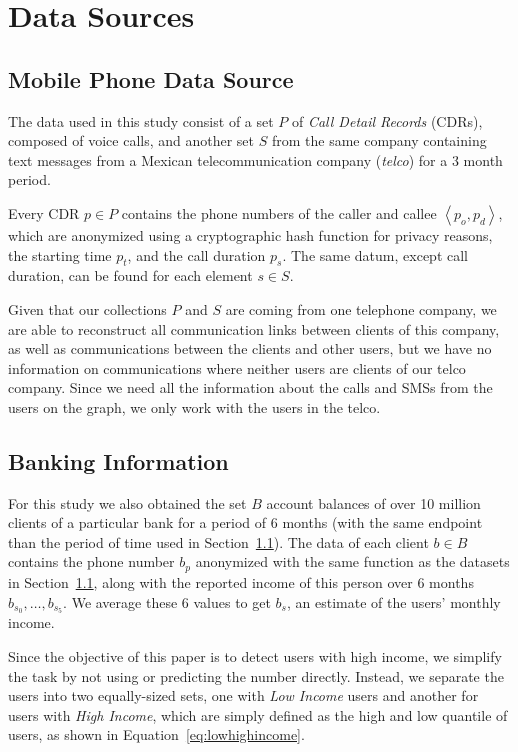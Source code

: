\section{Data Sources}
\label{sec:data_sources}

\subsection{Mobile Phone Data Source}
\label{subsec:telcoinformation}

The data used in this study consist of a set $P$ of \textit{Call Detail Records} (CDRs), composed of voice calls, and another set $S$ from the same company containing text messages from a Mexican telecommunication company (\textit{telco}) for a 3 month period.

Every CDR $p \in P$ contains the phone numbers of the caller and callee $\left< p_o, p_d \right>$, which are anonymized using a cryptographic hash function for privacy reasons, the starting time \( p_t \), and the call duration \( p_s \). The same datum, except call duration, can be found for each element $s \in S$.

Given that our collections $P$ and $S$ are coming from one telephone company, we are able to reconstruct all communication links between clients of this company, as well as communications between the clients and other users, but we have no information on communications where neither users are clients of our telco company. Since we need all the information about the calls and SMSs from the users on the graph, we only work with the users in the telco.

\subsection{Banking Information}

For this study we also obtained the set $B$ account balances of over 10 million clients of a particular bank for a period of 6 months (with the same endpoint than the period of time used in Section~\ref{subsec:telcoinformation}). The data of each client $b \in B$ contains the phone number $b_p$ anonymized with the same function as the datasets in Section~\ref{subsec:telcoinformation}, along with the reported income of this person over 6 months $b_{s_0}, \ldots, b_{s_5}$. We average these 6 values to get $b_s$, an estimate of the users' monthly income.

Since the objective of this paper is to detect users with high income, we simplify the task by not using or predicting the number directly. Instead, we separate the users into two equally-sized sets, one with \emph{Low Income} users and another for users with \emph{High Income}, which are simply defined as the high and low quantile of users, as shown in Equation~\ref{eq:lowhighincome}.

